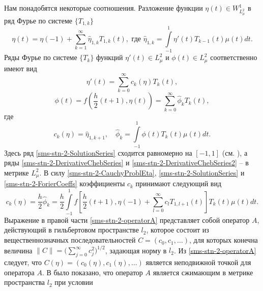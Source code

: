 
Нам понадобятся некоторые соотношения. Разложение функции $\eta(t)\in W_{L_\mu^2}^1$ в ряд Фурье по системе $\{T_{1,k}\}$
\begin{equation}\label{sms-stn-2-SolutionSeries}
\eta(t)=\eta(-1)+\sum\limits_{k=1}^{\infty}\hat\eta_{1,k} T_{1,k}(t),\text{ где } \hat\eta_{1,k}=\int\limits_{-1}^1\eta'(t)T_{k-1}(t)\mu(t)dt.
\end{equation}
Ряды Фурье по системе $\{T_k\}$ функций $\eta'(t)\in L^2_\mu$ и $\phi(t)\in L^2_\mu$ соответственно имеют вид 
\begin{equation}\label{sms-stn-2-DerivativeChebSeries}
\eta'(t)=\sum\limits_{k=0}^{\infty}c_k(\eta) T_k(t),
\end{equation}
\begin{equation}\label{sms-stn-2-DerivativeChebSeries2}
\phi(t)=f\left(\frac h2(t+1),\eta(t)\right)=\sum\limits_{k=0}^{\infty}\hat\phi_k T_k(t),
\end{equation}
где
\begin{equation}\label{sms-stn-2-ForierCoeffs}
c_k(\eta)=\hat\eta_{1,k+1},\quad\hat\phi_k=\int\limits_{-1}^1\phi(t)T_k(t)\mu(t)dt.
\end{equation}
Здесь ряд \eqref{sms-stn-2-SolutionSeries} сходится равномерно на $[-1,1]$ (см. \cite{sms-stn-2-SharIzVuz}), а ряды \eqref{sms-stn-2-DerivativeChebSeries} и \eqref{sms-stn-2-DerivativeChebSeries2} -- в метрике $L^2_\mu$. В силу \eqref{sms-stn-2-CauchyProblEta}, \eqref{sms-stn-2-SolutionSeries} и \eqref{sms-stn-2-ForierCoeffs} коэффициенты $c_k$ принимают следующий вид
\begin{equation}\label{sms-stn-2-operatorA}
c_k(\eta)=\frac h2\hat\phi_k=\frac h2\int\limits_{-1}^1f\left[\frac h2(t+1),\eta(-1)+\sum\limits_{l=0}^{\infty}c_l T_{1,l+1}(t)\right]T_k(t)\mu(t)dt.
\end{equation}
Выражение в правой части \eqref{sms-stn-2-operatorA} представляет собой оператор $A$, действующий в гильбертовом пространстве $l_2$, которое состоит из вещественнозначных последовательностей $C=(c_0,c_1,\ldots)$, для которых конечна величина $\|C\|=\bigl(\sum_{j=0}^\infty c_j^2)^{1/2}$, задающая норму в $l_2$. Из \eqref{sms-stn-2-operatorA} следует, что $C(\eta) = (c_0(\eta),c_1(\eta),\dots)$ является неподвижной точкой для оператора $A$. В \cite{sms-stn-2-PolOrtPorSobChebUrav} было показано, что оператор $A$ является сжимающим в метрике пространства $l_2$ при условии
